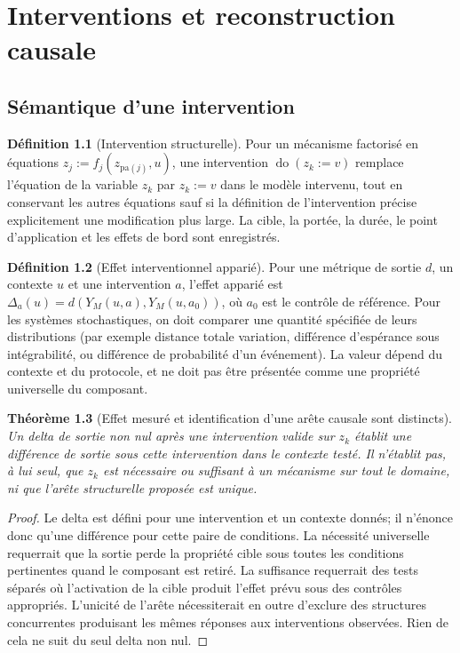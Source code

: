 \documentclass[11pt,oneside]{book}
\newtheorem{theoreme}{Théorème}[chapter]
\theoremstyle{definition}
\newtheorem{definition}[theoreme]{Définition}
\theoremstyle{remark}
\newcommand{\1}{\mathbf 1}
\newcommand{\doop}{\operatorname{do}}
\begin{document}
\chapter{Interventions et reconstruction causale}
\section{Sémantique d'une intervention}
\begin{definition}[Intervention structurelle]
Pour un mécanisme factorisé en équations $z_j:=f_j(z_{\mathrm{pa}(j)},u)$, une intervention $\doop(z_k:=v)$ remplace l'équation de la variable $z_k$ par $z_k:=v$ dans le modèle intervenu, tout en conservant les autres équations sauf si la définition de l'intervention précise explicitement une modification plus large. La cible, la portée, la durée, le point d'application et les effets de bord sont enregistrés.
\end{definition}

\begin{definition}[Effet interventionnel apparié]
Pour une métrique de sortie $d$, un contexte $u$ et une intervention $a$, l'effet apparié est $\Delta_a(u)=d(Y_M(u,a),Y_M(u,a_0))$, où $a_0$ est le contrôle de référence. Pour les systèmes stochastiques, on doit comparer une quantité spécifiée de leurs distributions (par exemple distance totale variation, différence d'espérance sous intégrabilité, ou différence de probabilité d'un événement). La valeur dépend du contexte et du protocole, et ne doit pas être présentée comme une propriété universelle du composant.
\end{definition}

\begin{theoreme}[Effet mesuré et identification d'une arête causale sont distincts]
Un delta de sortie non nul après une intervention valide sur $z_k$ établit une différence de sortie sous cette intervention dans le contexte testé. Il n'établit pas, à lui seul, que $z_k$ est nécessaire ou suffisant à un mécanisme sur tout le domaine, ni que l'arête structurelle proposée est unique.
\end{theoreme}
\begin{proof}
Le delta est défini pour une intervention et un contexte donnés; il n'énonce donc qu'une différence pour cette paire de conditions. La nécessité universelle requerrait que la sortie perde la propriété cible sous toutes les conditions pertinentes quand le composant est retiré. La suffisance requerrait des tests séparés où l'activation de la cible produit l'effet prévu sous des contrôles appropriés. L'unicité de l'arête nécessiterait en outre d'exclure des structures concurrentes produisant les mêmes réponses aux interventions observées. Rien de cela ne suit du seul delta non nul.\end{proof}
\end{document}
